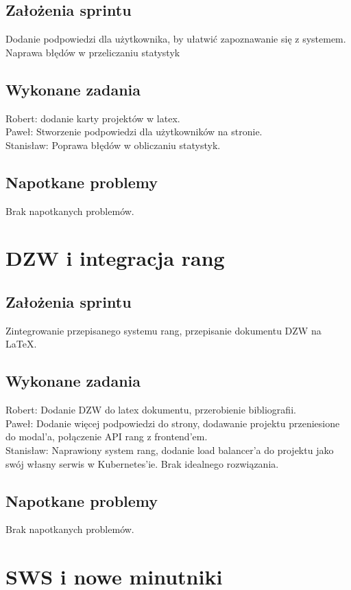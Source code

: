\documentclass[a4paper,11pt]{report}
\begin{document}
\subsection {Założenia sprintu}
Dodanie podpowiedzi dla użytkownika, by ułatwić zapoznawanie się z systemem. Naprawa błędów w przeliczaniu statystyk
\subsection {Wykonane zadania}
Robert: dodanie karty projektów w latex.\\
Paweł: Stworzenie podpowiedzi dla użytkowników na stronie. \\
Stanisław: Poprawa błędów w obliczaniu statystyk.  \\
\subsection {Napotkane problemy}
Brak napotkanych problemów.

\section {DZW i integracja rang}
\subsection {Założenia sprintu}
Zintegrowanie przepisanego systemu rang, przepisanie dokumentu DZW na LaTeX.
\subsection {Wykonane zadania}
Robert: Dodanie DZW do latex dokumentu, przerobienie bibliografii.\\ 
Paweł: Dodanie więcej podpowiedzi do strony, dodawanie projektu przeniesione do modal'a, połączenie API rang z frontend'em.\\
Stanisław: Naprawiony system rang, dodanie load balancer'a do projektu jako swój własny serwis w Kubernetes'ie. Brak idealnego rozwiązania. \\
\subsection {Napotkane problemy}
Brak napotkanych problemów.

\section {SWS i nowe minutniki}
\end{document}
